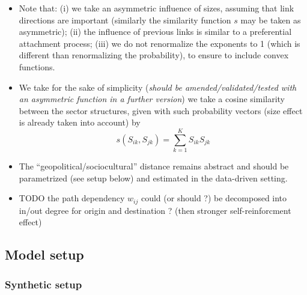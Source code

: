 \documentclass{article}
\begin{document}
\begin{enumerate}
\begin{itemize}
    \item Note that: (i) we take an asymmetric influence of sizes, assuming that link directions are important (similarly the similarity function $s$ may be taken as asymmetric); (ii) the influence of previous links is similar to a preferential attachment process; (iii) we do not renormalize the exponents to 1 (which is different than renormalizing the probability), to ensure to include convex functions.
    \item We take for the sake of simplicity (\textit{should be amended/validated/tested with an asymmetric function in a further version}) we take a cosine similarity between the sector structures, given with such probability vectors (size effect is already taken into account) by
    \begin{equation}
        s\left(S_{ik},S_{jk}\right) = \sum_{k=1}^{K} S_{ik} S_{jk}
    \end{equation}
    
    \item The ``geopolitical/sociocultural'' distance remains abstract and should be parametrized (see setup below) and estimated in the data-driven setting.
    \item %
    TODO the path dependency $w_{ij}$ could (or should ?) be decomposed into in/out degree for origin and destination ? (then stronger self-reinforcment effect)
    \end{itemize}
\end{enumerate}

\subsection{Model setup}

\subsubsection{Synthetic setup}
\end{document}
